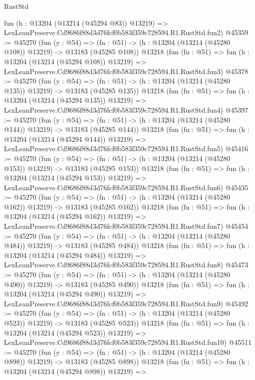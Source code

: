 \begin{lexlean}{RustStd}
\begin{coremodule}
    fun (h : @13204 (@13214 (@45294 @83)) @13219) =>
    LexLeanPreserve.Cd9686f88d3d76fcf0b583f359c728594.R1.RustStd.fun2)
@45359 := @45270
    (fun (y : @54) =>
    (fn : @51) -> (h : @13204 (@13214 (@45280 @108)) @13219) -> @13183 (@45285 @108))
    @13218
    (fun (fn : @51) =>
    fun (h : @13204 (@13214 (@45294 @108)) @13219) =>
    LexLeanPreserve.Cd9686f88d3d76fcf0b583f359c728594.R1.RustStd.fun3)
@45378 := @45270
    (fun (y : @54) =>
    (fn : @51) -> (h : @13204 (@13214 (@45280 @135)) @13219) -> @13183 (@45285 @135))
    @13218
    (fun (fn : @51) =>
    fun (h : @13204 (@13214 (@45294 @135)) @13219) =>
    LexLeanPreserve.Cd9686f88d3d76fcf0b583f359c728594.R1.RustStd.fun4)
@45397 := @45270
    (fun (y : @54) =>
    (fn : @51) -> (h : @13204 (@13214 (@45280 @144)) @13219) -> @13183 (@45285 @144))
    @13218
    (fun (fn : @51) =>
    fun (h : @13204 (@13214 (@45294 @144)) @13219) =>
    LexLeanPreserve.Cd9686f88d3d76fcf0b583f359c728594.R1.RustStd.fun5)
@45416 := @45270
    (fun (y : @54) =>
    (fn : @51) -> (h : @13204 (@13214 (@45280 @153)) @13219) -> @13183 (@45285 @153))
    @13218
    (fun (fn : @51) =>
    fun (h : @13204 (@13214 (@45294 @153)) @13219) =>
    LexLeanPreserve.Cd9686f88d3d76fcf0b583f359c728594.R1.RustStd.fun6)
@45435 := @45270
    (fun (y : @54) =>
    (fn : @51) -> (h : @13204 (@13214 (@45280 @162)) @13219) -> @13183 (@45285 @162))
    @13218
    (fun (fn : @51) =>
    fun (h : @13204 (@13214 (@45294 @162)) @13219) =>
    LexLeanPreserve.Cd9686f88d3d76fcf0b583f359c728594.R1.RustStd.fun7)
@45454 := @45270
    (fun (y : @54) =>
    (fn : @51) -> (h : @13204 (@13214 (@45280 @484)) @13219) -> @13183 (@45285 @484))
    @13218
    (fun (fn : @51) =>
    fun (h : @13204 (@13214 (@45294 @484)) @13219) =>
    LexLeanPreserve.Cd9686f88d3d76fcf0b583f359c728594.R1.RustStd.fun8)
@45473 := @45270
    (fun (y : @54) =>
    (fn : @51) -> (h : @13204 (@13214 (@45280 @490)) @13219) -> @13183 (@45285 @490))
    @13218
    (fun (fn : @51) =>
    fun (h : @13204 (@13214 (@45294 @490)) @13219) =>
    LexLeanPreserve.Cd9686f88d3d76fcf0b583f359c728594.R1.RustStd.fun9)
@45492 := @45270
    (fun (y : @54) =>
    (fn : @51) -> (h : @13204 (@13214 (@45280 @523)) @13219) -> @13183 (@45285 @523))
    @13218
    (fun (fn : @51) =>
    fun (h : @13204 (@13214 (@45294 @523)) @13219) =>
    LexLeanPreserve.Cd9686f88d3d76fcf0b583f359c728594.R1.RustStd.fun10)
@45511 := @45270
    (fun (y : @54) =>
    (fn : @51) -> (h : @13204 (@13214 (@45280 @898)) @13219) -> @13183 (@45285 @898))
    @13218
    (fun (fn : @51) =>
    fun (h : @13204 (@13214 (@45294 @898)) @13219) =>

\end{coremodule}
\end{lexlean}
